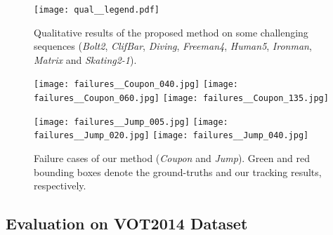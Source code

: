 \documentclass[10pt,twocolumn,letterpaper]{article}
\begin{document}
\begin{figure*}
\begin{center}
\texttt{[image: qual\_\_legend.pdf]}

\end{center}
\vspace{-5mm}
\caption{Qualitative results of the proposed method on some challenging sequences (\emph{Bolt2}, \emph{ClifBar}, \emph{Diving}, \emph{Freeman4}, \emph{Human5}, \emph{Ironman}, \emph{Matrix} and \emph{Skating2-1}).}
\label{fig:qual}
\end{figure*}

\begin{figure}[t]
\begin{center}
\texttt{[image: failures\_\_Coupon\_040.jpg]}
\texttt{[image: failures\_\_Coupon\_060.jpg]}
\texttt{[image: failures\_\_Coupon\_135.jpg]}

\texttt{[image: failures\_\_Jump\_005.jpg]}
\texttt{[image: failures\_\_Jump\_020.jpg]}
\texttt{[image: failures\_\_Jump\_040.jpg]}

\end{center}
\vspace{-5mm}
\caption{Failure cases of our method (\emph{Coupon} and \emph{Jump}). Green and red bounding boxes denote the ground-truths and our tracking results, respectively.}
\label{fig:failure}
\end{figure}


\subsection{Evaluation on VOT2014 Dataset}
\end{document}
